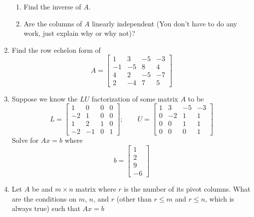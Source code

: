 \documentclass[14pt]{amsart}
\begin{document}
\begin{enumerate}
\begin{enumerate}

\item  Find the inverse of $A$.

\item  Are the columns of $A$ linearly independent (You don't have to do any work, just explain why or why not)?

\end{enumerate}

\item  Find the row echelon form of
%
\begin{equation*}
A = \begin{bmatrix}
1 & 3 & -5 & -3\\
-1 & -5 & 8 & 4\\
4 & 2 & -5 & -7\\
2 & -4 & 7 & 5
\end{bmatrix}
\end{equation*}

\pagebreak

\item  Suppose we know the $LU$ factorization of some matrix $A$ to be
%
\begin{equation*}
L = \begin{bmatrix}
1 & 0 & 0 & 0\\
-2 & 1 & 0 & 0\\
1 & 2 & 1 & 0\\
-2 & -1 & 0 & 1
\end{bmatrix};\qquad U = \begin{bmatrix}
1 & 3 & -5 & -3\\
0 & -2 & 1 & 1\\
0 & 0 & 1 & 1\\
0 & 0 & 0 & 1
\end{bmatrix}
\end{equation*}
%
Solve for $Ax = b$ where
%
\begin{equation*}
b = \begin{bmatrix}
1\\
2\\
9\\
-6
\end{bmatrix}
\end{equation*}

\item  Let $A$ be and $m \times n$ matrix where $r$ is the number of its pivot columns.
What are the conditions on $m$, $n$, and $r$ (other than $r \leq m$ and $r \leq n$, which
is always true) such that $Ax = b$


\end{enumerate}
\end{document}
